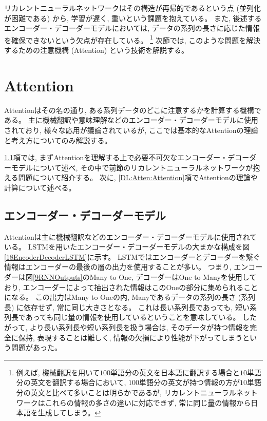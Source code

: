 リカレントニューラルネットワークはその構造が再帰的であるという点 (並列化が困難である) から, 学習が遅く, 重いという課題を抱えている。
また, 後述するエンコーダー・デコーダーモデルにおいては, データの系列の長さに応じた情報を確保できないという欠点が存在している。
\footnote{例えば, 機械翻訳を用いて$100$単語分の英文を日本語に翻訳する場合と$10$単語分の英文を翻訳する場合において, $100$単語分の英文が持つ情報の方が$10$単語分の英文と比べて多いことは明らかであるが, リカレントニューラルネットワークはこれらの情報の多さの違いに対応できず, 常に同じ量の情報から日本語を生成してしまう。}
次節では, このような問題を解決するための注意機構 (Attention) という技術を解説する。


\section{Attention} \label{DL:Attention}

Attention\cite{BahdanauAttention, LuongAttention}はその名の通り, ある系列データのどこに注意するかを計算する機構である。
主に機械翻訳や意味理解などのエンコーダー・デコーダーモデルに使用されており, 様々な応用が議論されているが, ここでは基本的なAttentionの理論と考え方についてのみ解説する。

\ref{DL:Atten:EncoderDecoderModel}項では, まずAttentionを理解する上で必要不可欠なエンコーダー・デコーダーモデルについて述べ, その中で前節のリカレントニューラルネットワークが抱える問題について紹介する。
次に, \ref{DL:Atten:Attention}項でAttentionの理論や計算について述べる。


\subsection{エンコーダー・デコーダーモデル} \label{DL:Atten:EncoderDecoderModel}

Attentionは主に機械翻訳などのエンコーダー・デコーダーモデルに使用されている。
LSTMを用いたエンコーダー・デコーダーモデルの大まかな構成を図\ref{18EncoderDecoderLSTM}に示す。
LSTMではエンコーダーとデコーダーを繋ぐ情報はエンコーダーの最後の層の出力を使用することが多い。
つまり, エンコーダーは図\ref{9RNNOutputs}のMany to One, デコーダーはOne to Manyを使用しており, エンコーダーによって抽出された情報はこのOneの部分に集められることになる。
この出力はMany to Oneの内, Manyであるデータの系列の長さ (系列長) に依存せず, 常に同じ大きさとなる。
これは長い系列長であっても, 短い系列長であっても同じ量の情報を使用しているということを意味している。
したがって, より長い系列長や短い系列長を扱う場合は, そのデータが持つ情報を完全に保持, 表現することは難しく, 情報の欠損により性能が下がってしまうという問題があった。

